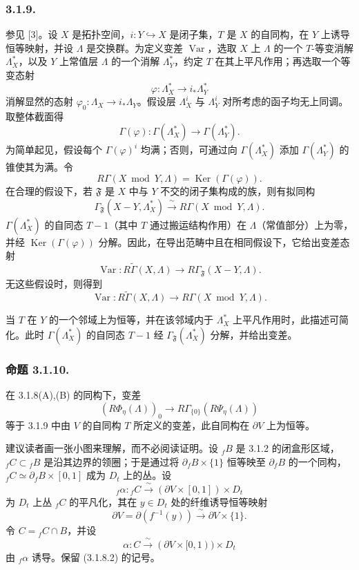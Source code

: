 \subsubsection*{3.1.9.}
参见 [3]。设 $X$ 是拓扑空间，$i:Y\hookrightarrow X$ 是闭子集，$T$ 是 $X$ 的自同构，在 $Y$ 上诱导恒等映射，并设 $\Lambda$ 是交换群。为定义变差 $\operatorname{Var}$，选取 $X$ 上 $\Lambda$ 的一个 $T$-等变消解 $\Lambda_X^*$，以及 $Y$ 上常值层 $\Lambda$ 的一个消解 $\Lambda_Y^*$，约定 $T$ 在其上平凡作用；再选取一个等变态射
\[
\varphi:\Lambda_X^*\longrightarrow i_*\Lambda_Y^*
\]
消解显然的态射 $\varphi_0:\Lambda_X\to i_*\Lambda_Y$。假设层 $\Lambda_X^i$ 与 $\Lambda_Y^i$ 对所考虑的函子均无上同调。取整体截面得
\[
\Gamma(\varphi):\Gamma(\Lambda_X^*)
\longrightarrow\Gamma(\Lambda_Y^*).
\]
为简单起见，假设每个 $\Gamma(\varphi)^i$ 均满；否则，可通过向 $\Gamma(\Lambda_X^*)$ 添加 $\Gamma(\Lambda_Y^*)$ 的锥使其为满。令
\[
R\Gamma(X\bmod Y,\Lambda)=\operatorname{Ker}(\Gamma(\varphi)).
\]
在合理的假设下，若 $\mathfrak F$ 是 $X$ 中与 $Y$ 不交的闭子集构成的族，则有拟同构
\[
\Gamma_{\mathfrak F}(X-Y,\Lambda_X^*)
\xrightarrow{\ \sim\ }R\Gamma(X\bmod Y,\Lambda).
\]
$\Gamma(\Lambda_X^*)$ 的自同态 $T-1$（其中 $T$ 通过搬运结构作用）在 $\Lambda$（常值部分）上为零，并经 $\operatorname{Ker}(\Gamma(\varphi))$ 分解。因此，在导出范畴中且在相同假设下，它给出变差态射
\[
\operatorname{Var}:R\widetilde\Gamma(X,\Lambda)
\longrightarrow R\Gamma_{\mathfrak F}(X-Y,\Lambda).
\]
无这些假设时，则得到
\[
\operatorname{Var}:R\widetilde\Gamma(X,\Lambda)
\longrightarrow R\Gamma(X\bmod Y,\Lambda).
\]

当 $T$ 在 $Y$ 的一个邻域上为恒等，并在该邻域内于 $\Lambda_X^*$ 上平凡作用时，此描述可简化。此时 $\Gamma(\Lambda_X^*)$ 的自同态 $T-1$ 经 $\Gamma_{\mathfrak F}(\Lambda_X^*)$ 分解，并给出变差。

\subsubsection*{命题 3.1.10.}
在 3.1.8(A),(B) 的同构下，变差
\[
(R\Phi_\eta(\Lambda))_0
\longrightarrow R\Gamma_{\{0\}}(R\Psi_\eta(\Lambda))
\]
等于 3.1.9 中由 $V$ 的自同构 $T$ 所定义的变差，此自同构在 $\partial V$ 上为恒等。

建议读者画一张小图来理解，而不必阅读证明。设 ${}_fB$ 是 3.1.2 的闭盒形区域，${}_fC\subset{}_fB$ 是沿其边界的领圈；于是通过将 $\partial_fB\times\{1\}$ 恒等映至 $\partial_fB$ 的一个同构，${}_fC\simeq\partial_fB\times[0,1]$ 成为 $D_t$ 上的丛。设
\[
{}_f\alpha:{}_fC\xrightarrow{\ \sim\ }
(\partial V\times[0,1])\times D_t
\]
为 $D_t$ 上丛 ${}_fC$ 的平凡化，其在 $y\in D_t$ 处的纤维诱导恒等映射
\[
\partial V=\partial(f^{-1}(y))
\xrightarrow{\ \sim\ }\partial V\times\{1\}.
\]
令 $C={}_fC\cap B$，并设
\[
\alpha:C\xrightarrow{\ \sim\ }
(\partial V\times[0,1))\times D_t
\]
由 ${}_f\alpha$ 诱导。保留 (3.1.8.2) 的记号。

